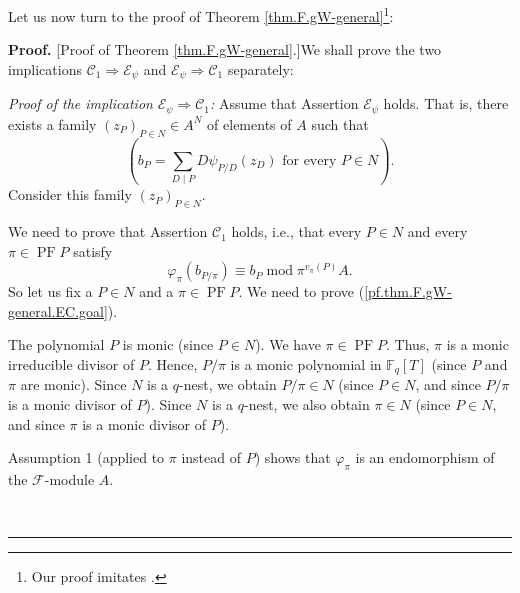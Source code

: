 \documentclass[numbers=enddot,12pt,final,onecolumn,notitlepage]{scrartcl}%
\theoremstyle{definition}
\newenvironment{proof}[1][Proof]{\noindent\textbf{#1.} }{\ \rule{0.5em}{0.5em}}
\let\sumnonlimits\sum
\renewcommand{\sum}{\sumnonlimits\limits}
\begin{document}
Let us now turn to the proof of Theorem \ref{thm.F.gW-general}\footnote{Our
proof imitates \cite[solution to Exercise 2.9.6]{reiner-hopf}.}:

\begin{proof}
[Proof of Theorem \ref{thm.F.gW-general}.]We shall prove the two implications
$\mathcal{C}_{1}\Longrightarrow\mathcal{E}_{\psi}$ and $\mathcal{E}_{\psi
}\Longrightarrow\mathcal{C}_{1}$ separately:

\textit{Proof of the implication }$\mathcal{E}_{\psi}\Longrightarrow
\mathcal{C}_{1}$\textit{:} Assume that Assertion $\mathcal{E}_{\psi}$ holds.
That is, there exists a family $\left(  z_{P}\right)  _{P\in N}\in A^{N}$ of
elements of $A$ such that%
\begin{equation}
\left(  b_{P}=\sum_{D\mid P}D\psi_{P / D}\left(  z_{D}\right)  \text{ for
every }P\in N\right)  . \label{pf.thm.F.gW-general.EC.ass}%
\end{equation}
Consider this family $\left(  z_{P}\right)  _{P\in N}$.

We need to prove that Assertion $\mathcal{C}_{1}$ holds, i.e., that every
$P\in N$ and every $\pi\in\operatorname{PF}P$ satisfy%
\begin{equation}
\varphi_{\pi}\left(  b_{P / \pi}\right)  \equiv b_{P}\operatorname{mod}%
\pi^{v_{\pi}\left(  P\right)  }A. \label{pf.thm.F.gW-general.EC.goal}%
\end{equation}
So let us fix a $P\in N$ and a $\pi\in\operatorname*{PF}P$. We need to prove
(\ref{pf.thm.F.gW-general.EC.goal}).

The polynomial $P$ is monic (since $P\in N$). We have $\pi\in
\operatorname*{PF}P$. Thus, $\pi$ is a monic irreducible divisor of $P$.
Hence, $P/\pi$ is a monic polynomial in $\mathbb{F}_{q}\left[  T\right]  $
(since $P$ and $\pi$ are monic). Since $N$ is a $q$-nest, we obtain $P/\pi\in
N$ (since $P\in N$, and since $P/\pi$ is a monic divisor of $P$). Since $N$ is
a $q$-nest, we also obtain $\pi\in N$ (since $P\in N$, and since $\pi$ is a
monic divisor of $P$).

Assumption 1 (applied to $\pi$ instead of $P$) shows that $\varphi_{\pi}$ is
an endomorphism of the $\mathcal{F}$-module $A$.


\end{proof}
\end{document}
